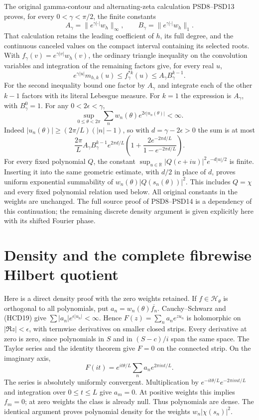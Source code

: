 \documentclass[11pt]{article}
\newcommand{\R}{\mathbb R}
\begin{document}
The original gamma-contour and alternating-zeta calculation
PSD8--PSD13 proves, for every $0<\gamma<\pi/2$, the finite
constants
\[
 A_\gamma=\|e^{\gamma|\cdot|}w_h\|_\infty,\qquad
 B_\gamma=\|e^{\gamma|\cdot|}w_h\|_1.
\]
That calculation retains the leading coefficient of $h$,
its full degree, and the continuous canceled values on the
compact interval containing its selected roots. With
$f_\gamma(v)=e^{\gamma|v|}w_h(v)$, the ordinary triangle
inequality on the convolution variables and integration
of the remaining factors give, for every real $u$,
\[
 e^{\gamma|u|}m_{h,k}(u)
 \le f_\gamma^{*k}(u)
 \le A_\gamma B_\gamma^{k-1}.
 \tag{HCD19a}
\]
For the second inequality bound one factor by $A_\gamma$
and integrate each of the other $k-1$ factors with its
literal Lebesgue measure. For $k=1$ the expression is
$A_\gamma$, with $B_\gamma^0=1$.
For any $0<2\epsilon<\gamma$,
\[
 \sup_{0\le\theta<2\pi}
 \sum_nw_n(\theta)e^{2\epsilon|u_n(\theta)|}<\infty.
 \tag{HCD19}
\]
Indeed $|u_n(\theta)|\ge(2\pi/L)(|n|-1)$, so with
$d=\gamma-2\epsilon>0$ the sum is at most
\[
 \frac{2\pi}{L}A_\gamma B_\gamma^{k-1}
 e^{2\pi d/L}
 \left(1+\frac{2e^{-2\pi d/L}}{1-e^{-2\pi d/L}}\right).
\]
For every fixed polynomial $Q$, the constant
$\sup_{u\in\R}|Q(c+iu)|^2e^{-d|u|/2}$ is finite.
Inserting it into the same geometric estimate, with
$d/2$ in place of $d$, proves uniform exponential
summability of $w_n(\theta)|Q(s_n(\theta))|^2$.
This includes $Q=\chi$ and every fixed polynomial
relation used below. All original constants in the
weights are unchanged. The full source proof of
PSD8--PSD14 is a dependency of this continuation;
the remaining discrete density argument is given
explicitly here with its shifted Fourier phase.

\section{Density and the complete fibrewise Hilbert quotient}

Here is a direct density proof with the zero weights retained.
If $f\in\mathcal H_\theta$ is orthogonal to all polynomials,
put $a_n=w_n(\theta)\overline{f_n}$. Cauchy--Schwarz and
(HCD19) give $\sum|a_n|e^{\epsilon|u_n|}<\infty$.
Hence $F(z)=\sum_n a_ne^{zu_n}$ is holomorphic on
$|\Re z|<\epsilon$, with termwise derivatives on smaller
closed strips. Every derivative at zero is zero, since
polynomials in $S$ and in $(S-c)/i$ span the same space.
The Taylor series and the identity theorem give $F=0$
on the connected strip. On the imaginary axis,
\[
 F(it)=e^{it\theta/L}\sum_n a_ne^{2\pi int/L}.
\]
The series is absolutely uniformly convergent.
Multiplication by $e^{-it\theta/L}e^{-2\pi imt/L}$ and
integration over $0\le t\le L$ give $a_m=0$.
At positive weights this implies $f_m=0$; at zero weights
the class is already null. Thus polynomials are dense.
The identical argument proves polynomial density for
the weights $w_n|\chi(s_n)|^2$.
\end{document}
